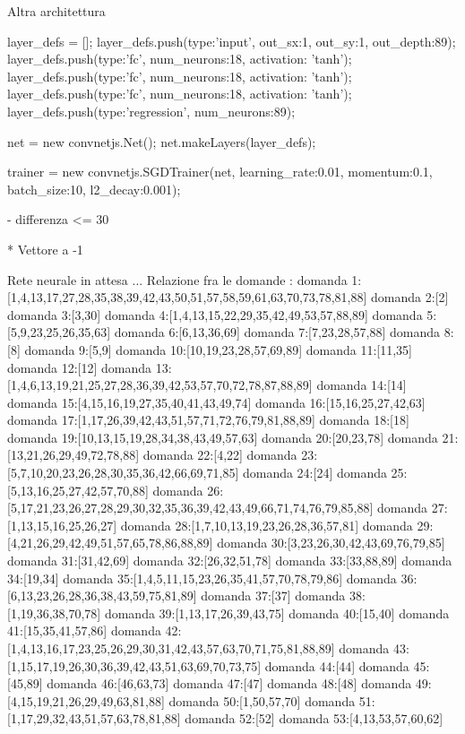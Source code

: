 Altra architettura

layer_defs = [];
layer_defs.push({type:'input', out_sx:1, out_sy:1, out_depth:89});
layer_defs.push({type:'fc', num_neurons:18, activation: 'tanh'});
layer_defs.push({type:'fc', num_neurons:18, activation: 'tanh'});
layer_defs.push({type:'fc', num_neurons:18, activation: 'tanh'});
layer_defs.push({type:'regression', num_neurons:89});

net = new convnetjs.Net();
net.makeLayers(layer_defs);

trainer = new convnetjs.SGDTrainer(net, {learning_rate:0.01, momentum:0.1, batch_size:10, l2_decay:0.001});

- differenza <= 30

* Vettore a -1

Rete neurale in attesa ...
Relazione fra le domande :
domanda 1:[1,4,13,17,27,28,35,38,39,42,43,50,51,57,58,59,61,63,70,73,78,81,88]
domanda 2:[2]
domanda 3:[3,30]
domanda 4:[1,4,13,15,22,29,35,42,49,53,57,88,89]
domanda 5:[5,9,23,25,26,35,63]
domanda 6:[6,13,36,69]
domanda 7:[7,23,28,57,88]
domanda 8:[8]
domanda 9:[5,9]
domanda 10:[10,19,23,28,57,69,89]
domanda 11:[11,35]
domanda 12:[12]
domanda 13:[1,4,6,13,19,21,25,27,28,36,39,42,53,57,70,72,78,87,88,89]
domanda 14:[14]
domanda 15:[4,15,16,19,27,35,40,41,43,49,74]
domanda 16:[15,16,25,27,42,63]
domanda 17:[1,17,26,39,42,43,51,57,71,72,76,79,81,88,89]
domanda 18:[18]
domanda 19:[10,13,15,19,28,34,38,43,49,57,63]
domanda 20:[20,23,78]
domanda 21:[13,21,26,29,49,72,78,88]
domanda 22:[4,22]
domanda 23:[5,7,10,20,23,26,28,30,35,36,42,66,69,71,85]
domanda 24:[24]
domanda 25:[5,13,16,25,27,42,57,70,88]
domanda 26:[5,17,21,23,26,27,28,29,30,32,35,36,39,42,43,49,66,71,74,76,79,85,88]
domanda 27:[1,13,15,16,25,26,27]
domanda 28:[1,7,10,13,19,23,26,28,36,57,81]
domanda 29:[4,21,26,29,42,49,51,57,65,78,86,88,89]
domanda 30:[3,23,26,30,42,43,69,76,79,85]
domanda 31:[31,42,69]
domanda 32:[26,32,51,78]
domanda 33:[33,88,89]
domanda 34:[19,34]
domanda 35:[1,4,5,11,15,23,26,35,41,57,70,78,79,86]
domanda 36:[6,13,23,26,28,36,38,43,59,75,81,89]
domanda 37:[37]
domanda 38:[1,19,36,38,70,78]
domanda 39:[1,13,17,26,39,43,75]
domanda 40:[15,40]
domanda 41:[15,35,41,57,86]
domanda 42:[1,4,13,16,17,23,25,26,29,30,31,42,43,57,63,70,71,75,81,88,89]
domanda 43:[1,15,17,19,26,30,36,39,42,43,51,63,69,70,73,75]
domanda 44:[44]
domanda 45:[45,89]
domanda 46:[46,63,73]
domanda 47:[47]
domanda 48:[48]
domanda 49:[4,15,19,21,26,29,49,63,81,88]
domanda 50:[1,50,57,70]
domanda 51:[1,17,29,32,43,51,57,63,78,81,88]
domanda 52:[52]
domanda 53:[4,13,53,57,60,62]
